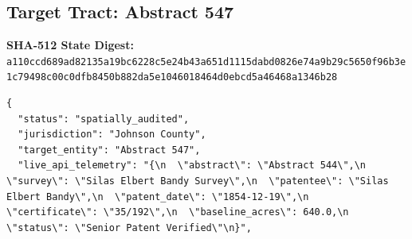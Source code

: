 \documentclass{article}
\begin{document}
\subsection*{Target Tract: Abstract 547}
\textbf{SHA-512 State Digest:}\\
\texttt{a110ccd689ad82135a19bc6228c5e24b43a651d1115dabd0826e74a9b29c5650f96b3e1c79498c00c0dfb8450b882da5e1046018464d0ebcd5a46468a1346b28}
\begin{verbatim}
{
  "status": "spatially_audited",
  "jurisdiction": "Johnson County",
  "target_entity": "Abstract 547",
  "live_api_telemetry": "{\n  \"abstract\": \"Abstract 544\",\n  \"survey\": \"Silas Elbert Bandy Survey\",\n  \"patentee\": \"Silas Elbert Bandy\",\n  \"patent_date\": \"1854-12-19\",\n  \"certificate\": \"35/192\",\n  \"baseline_acres\": 640.0,\n  \"status\": \"Senior Patent Verified\"\n}",

\end{verbatim}
\end{document}
